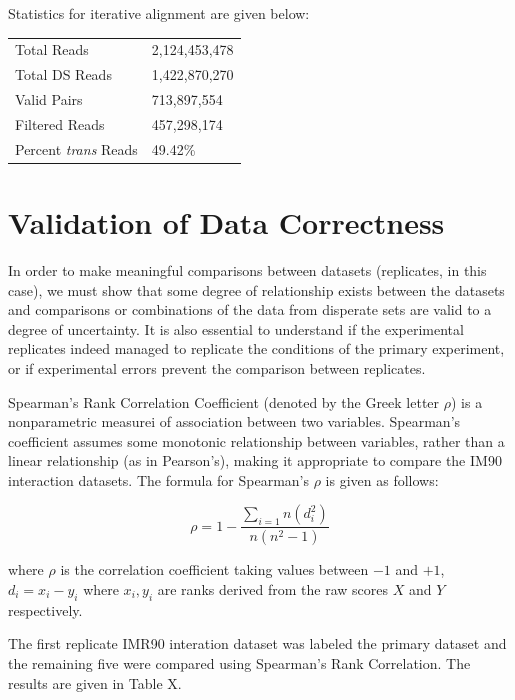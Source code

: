 \documentclass[phd,tocprelim]{cornell}
\begin{document}
Statistics for iterative alignment are given below:

\begin{center}
  \begin{table}
    \begin{tabular}{l l}
    Total Reads & 2,124,453,478 \\
    Total DS Reads & 1,422,870,270 \\
    Valid Pairs & 713,897,554 \\
    Filtered Reads & 457,298,174 \\
    Percent \textit{trans} Reads & 49.42\% \\
    \end{tabular}
  \end{table}
\end{center}


\chapter{Validation of Data Correctness}

In order to make meaningful comparisons between datasets (replicates,
in this case), we must show that some degree of relationship exists between
the datasets and comparisons or combinations of the data from disperate sets
are valid to a degree of uncertainty.  It is also essential to understand if the
experimental replicates indeed managed to replicate the conditions of the primary
experiment, or if experimental errors prevent the comparison between replicates.

Spearman's Rank Correlation Coefficient (denoted by the Greek letter $\rho$) is
a nonparametric measurei of association between two variables.
Spearman's coefficient assumes some monotonic relationship between variables,
rather than a linear relationship (as in Pearson's), making it appropriate
to compare the IM90 interaction datasets.  The formula for Spearman's $\rho$ is
given as follows:

\begin{equation}
\rho = 1 - \frac{\sum_{i=1}{n}(d_i^2)}{n(n^2 - 1)}
\end{equation}

where $\rho$ is the correlation coefficient taking values between $-1$ and $+1$,
$d_i = x_i - y_i$ where $x_i, y_i$ are ranks derived from the raw scores $X$ and
$Y$ respectively.

The first replicate IMR90 interation dataset was labeled the primary dataset
and the remaining five were compared using Spearman's Rank Correlation.  The
results are given in Table X.
\end{document}
